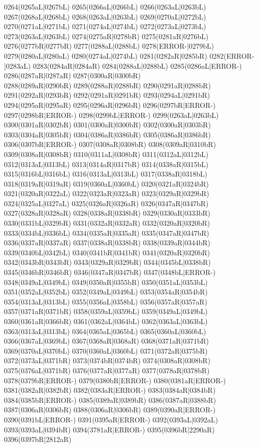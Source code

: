 0264(0265aL|0267bL) 0265(0266aL|0266bL) 0266(0263aL|0263bL) 0267(0268aL|0268bL) 0268(0263aL|0263bL) 0269(0270aL|0272bL) \\0270(0271aL|0271bL) 0271(0274aL|0274bL) 0272(0273aL|0273bL) 0273(0263aL|0263bL) 0274(0275aR|0278bR) 0275(0281aR|0276bL) 0276(0277bR|0277bR) 0277(0288aL|0288bL) 0278(ERROR-|0279bL) \\0279(0280aL|0280aL) 0280(0274aL|0274bL) 0281(0282aR|0285bR) 0282(ERROR-|0283aL) 0283(0284aR|0284aR) 0284(0288aL|0288bL) 0285(0286aL|ERROR-) 0286(0287aR|0287aR) 0287(0300aR|0300bR) \\0288(0289aR|0290bR) 0289(0288aR|0288bR) 0290(0291aR|0288bR) 0291(0292aR|0293bR) 0292(0291aR|0291bR) 0293(0294aL|0291bR) 0294(0295aR|0295aR) 0295(0296aR|0296bR) 0296(0297bR|ERROR-) \\0297(0298bR|ERROR-) 0298(0299bL|ERROR-) 0299(0263aL|0263bL) 0300(0301aR|0302bR) 0301(0300aR|0300bR) 0302(0300aR|0303bR) 0303(0304aR|0305bR) 0304(0386aR|0386bR) 0305(0386aR|0386bR) \\0306(0307bR|ERROR-) 0307(0308aR|0308bR) 0308(0309aR|0310bR) 0309(0308aR|0308bR) 0310(0311aL|0308bR) 0311(0312aL|0312bL) 0312(0313aL|0313bL) 0313(0314aR|0317bR) 0314(0338aR|0315bL) \\0315(0316bL|0316bL) 0316(0313aL|0313bL) 0317(0338aR|0318bL) 0318(0319aR|0319aR) 0319(0360aL|0360bL) 0320(0321aR|0324bR) 0321(0320aR|0322aL) 0322(0323aR|0323aR) 0323(0329aR|0329bR) \\0324(0325aL|0327aL) 0325(0326aR|0326aR) 0326(0347aR|0347bR) 0327(0328aR|0328aR) 0328(0338aR|0338bR) 0329(0330aR|0333bR) 0330(0331bL|0329bR) 0331(0332aR|0332aR) 0332(0320aR|0320bR) \\0333(0334bL|0336bL) 0334(0335aR|0335aR) 0335(0347aR|0347bR) 0336(0337aR|0337aR) 0337(0338aR|0338bR) 0338(0339aR|0344bR) 0339(0340bL|0342bL) 0340(0341bR|0341bR) 0341(0320aR|0320bR) \\0342(0343bR|0343bR) 0343(0329aR|0329bR) 0344(0345bL|0338bR) 0345(0346bR|0346bR) 0346(0347aR|0347bR) 0347(0348bL|ERROR-) 0348(0349aL|0349bL) 0349(0350aR|0355bR) 0350(0351aL|0353bL) \\0351(0352aL|0352bL) 0352(0349aL|0349bL) 0353(0354aR|0354bR) 0354(0313aL|0313bL) 0355(0356aL|0358bL) 0356(0357aR|0357aR) 0357(0371aR|0371bR) 0358(0359aL|0359bL) 0359(0349aL|0349bL) \\0360(0361aR|0366bR) 0361(0362aL|0364bL) 0362(0363aL|0363bL) 0363(0313aL|0313bL) 0364(0365aL|0365bL) 0365(0360aL|0360bL) 0366(0367aL|0369bL) 0367(0368aR|0368aR) 0368(0371aR|0371bR) \\0369(0370aL|0370bL) 0370(0360aL|0360bL) 0371(0372aR|0375bR) 0372(0373aL|0371bR) 0373(0374bR|0374bR) 0374(0308aR|0308bR) 0375(0376aL|0371bR) 0376(0377aR|0377aR) 0377(0378aR|0378bR) \\0378(0379bR|ERROR-) 0379(0380bR|ERROR-) 0380(0381aR|ERROR-) 0381(0382aR|0382bR) 0382(0383aR|ERROR-) 0383(0384aR|0384bR) 0384(0385bR|ERROR-) 0385(0389aR|0389bR) 0386(0387aR|0388bR) \\0387(0306aR|0306bR) 0388(0306aR|0306bR) 0389(0390aR|ERROR-) 0390(0391bL|ERROR-) 0391(0395aR|ERROR-) 0392(0393aL|0392aL) 0393(0393aL|0394bR) 0394(3781aR|ERROR-) 0395(0396bR|2290aR) \\0396(0397bR|2812aR) 
